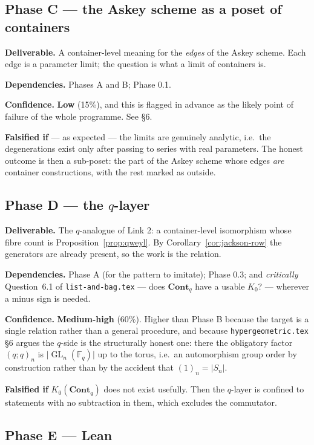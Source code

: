 \documentclass[11pt,a4paper]{article}
\theoremstyle{definition}
\theoremstyle{remark}
\newcommand{\FF}{\mathbb{F}}
\newcommand{\cat}[1]{\mathbf{#1}}
\newcommand{\Cont}{\cat{Cont}}
\newcommand{\norm}[1]{\lvert #1 \rvert}
\DeclareMathOperator{\GL}{GL}
\begin{document}
\subsection*{Phase C --- the Askey scheme as a poset of containers}

\textbf{Deliverable.} A container-level meaning for the \emph{edges} of the Askey
scheme. Each edge is a parameter limit; the question is what a limit of containers is.

\textbf{Dependencies.} Phases A and B; Phase 0.1.

\textbf{Confidence.} \textbf{Low} (15\%), and this is flagged in advance as the likely
point of failure of the whole programme. See \S6.

\textbf{Falsified if} --- as expected --- the limits are genuinely analytic, i.e.\ the
degenerations exist only after passing to series with real parameters. The honest
outcome is then a sub-poset: the part of the Askey scheme whose edges \emph{are}
container constructions, with the rest marked as outside.

\subsection*{Phase D --- the $q$-layer}

\textbf{Deliverable.} The $q$-analogue of Link 2: a container-level isomorphism whose
fibre count is Proposition~\ref{prop:qweyl}. By Corollary~\ref{cor:jackson-row} the
generators are already present, so the work is the relation.

\textbf{Dependencies.} Phase A (for the pattern to imitate); Phase 0.3; and
\emph{critically} Question~6.1 of \texttt{list-and-bag.tex} --- does $\Cont_q$ have a
usable $K_0$? --- wherever a minus sign is needed.

\textbf{Confidence.} \textbf{Medium-high} (60\%). Higher than Phase B because the
target is a single relation rather than a general procedure, and because
\texttt{hypergeometric.tex} \S6 argues the $q$-side is the structurally honest one:
there the obligatory factor $(q;q)_n$ is $\norm{\GL_n(\FF_q)}$ up to the torus, i.e.\
an automorphism group order by construction rather than by the accident that
$(1)_n = \norm{S_n}$.

\textbf{Falsified if} $K_0(\Cont_q)$ does not exist usefully. Then the $q$-layer is
confined to statements with no subtraction in them, which excludes the commutator.

\subsection*{Phase E --- Lean}
\end{document}
